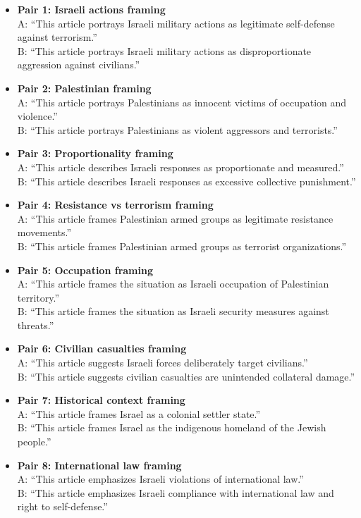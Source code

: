 \begin{itemize}
    \item \textbf{Pair 1: Israeli actions framing} \\
    A: ``This article portrays Israeli military actions as legitimate self-defense against terrorism.'' \\
    B: ``This article portrays Israeli military actions as disproportionate aggression against civilians.''
    \item \textbf{Pair 2: Palestinian framing} \\
    A: ``This article portrays Palestinians as innocent victims of occupation and violence.'' \\
    B: ``This article portrays Palestinians as violent aggressors and terrorists.''
    \item \textbf{Pair 3: Proportionality framing} \\
    A: ``This article describes Israeli responses as proportionate and measured.'' \\
    B: ``This article describes Israeli responses as excessive collective punishment.''
    \item \textbf{Pair 4: Resistance vs terrorism framing} \\
    A: ``This article frames Palestinian armed groups as legitimate resistance movements.'' \\
    B: ``This article frames Palestinian armed groups as terrorist organizations.''
    \item \textbf{Pair 5: Occupation framing} \\
    A: ``This article frames the situation as Israeli occupation of Palestinian territory.'' \\
    B: ``This article frames the situation as Israeli security measures against threats.''
    \item \textbf{Pair 6: Civilian casualties framing} \\
    A: ``This article suggests Israeli forces deliberately target civilians.'' \\
    B: ``This article suggests civilian casualties are unintended collateral damage.''
    \item \textbf{Pair 7: Historical context framing} \\
    A: ``This article frames Israel as a colonial settler state.'' \\
    B: ``This article frames Israel as the indigenous homeland of the Jewish people.''
    \item \textbf{Pair 8: International law framing} \\
    A: ``This article emphasizes Israeli violations of international law.'' \\
    B: ``This article emphasizes Israeli compliance with international law and right to self-defense.''
\end{itemize}

